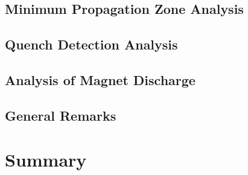 \documentclass[11pt,a4paper]{report}
\begin{document}
\section{Minimum Propagation Zone Analysis}


\section{Quench Detection Analysis}


\section{Analysis of Magnet Discharge}


\section{General Remarks}


\clearpage
\chapter{Summary}
\label{chapter:research_questions_discussions}

\end{document}
